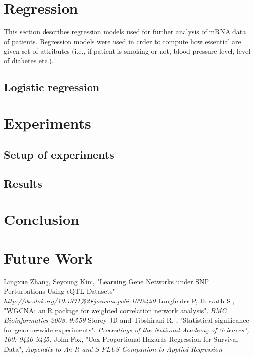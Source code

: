 \documentclass{ba-kecs}
\numberwithin{figure}{section}
\numberwithin{equation}{section}
\begin{document}
\section{Regression}
This section describes regression models used for further analysis of mRNA data of patients. Regression models were used in order to compute how essential are given set of attributes (i.e., if patient is smoking or not, blood pressure level, level of diabetes etc.).
\subsection{Logistic regression}



\section{Experiments}
\subsection{Setup of experiments}
\subsection{Results}

\section{Conclusion}

\section{Future Work}




\begin{thebibliography}{99}
 Lingxue Zhang, Seyoung Kim, "Learning Gene Networks under SNP Perturbations Using eQTL Datasets" \emph{http://dx.doi.org/10.1371\%2Fjournal.pcbi.1003420}
 Langfelder P, Horvath S , "WGCNA: an R package for weighted correlation network analysis". \emph{BMC Bioinformatics 2008, 9:559}
 Storey JD and Tibshirani R. , "Statistical significance for genome-wide experiments".\emph{ Proceedings of the National Academy of Sciences", 100: 9440-9445.}
 John Fox, "Cox Proportional-Hazards Regression for Survival Data", \emph{Appendix to An R and S-PLUS Companion to Applied Regression}

\end{thebibliography}

\appendix
\end{document}

